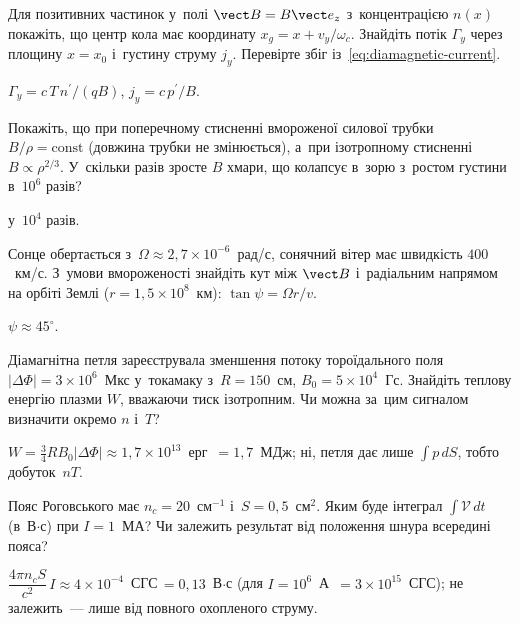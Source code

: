 \begin{problem}\label{prb:DiamagneticFlux}
	Для позитивних частинок у~полі $\vect B=B\vect e_z$ з~концентрацією $n(x)$ покажіть,
	що центр кола має координату $x_g=x+v_y/\omega_c$. Знайдіть потік $\Gamma_y$ через
	площину $x=x_0$ і~густину струму $j_y$. Перевірте збіг
	із~\eqref{eq:diamagnetic-current}.
	\begin{solution}
		$\Gamma_y=c\,T\,n^\prime/(qB)$, $j_y=c\,p^\prime/B$.
	\end{solution}
\end{problem}

\begin{problem}\label{prb:FluxTube}
	Покажіть, що при поперечному стисненні вмороженої силової трубки $B/\rho=\text{const}$
	(довжина трубки не змінюється), а~при ізотропному стисненні $B\propto\rho^{2/3}$.
	У~скільки разів зросте $B$ хмари, що колапсує в~зорю з~ростом густини в~$10^{6}$ разів?
	\begin{solution}
		у~$10^4$ разів.
	\end{solution}
\end{problem}

\begin{problem}\label{prb:ParkerSpiral}
	Сонце обертається з~$\Omega\approx2{,}7\times10^{-6}$~рад/с, сонячний вітер має швидкість
	$400$~км/с. З~умови вмороженості знайдіть кут між $\vect B$ і~радіальним напрямом на орбіті Землі
	($r=1{,}5\times10^{8}$~км): $\tan\psi=\Omega r/v$.
	\begin{solution}
		$\psi\approx45^\circ$.
	\end{solution}
\end{problem}

\begin{problem}\label{prb:DiamagneticLoop}
Діамагнітна петля зареєструвала зменшення потоку тороїдального поля $|\Delta\Phi|=3\times10^{6}$~Мкс у~токамаку з~$R=150$~см,
$B_0=5\times10^4$~Гс. Знайдіть теплову енергію плазми $W$, вважаючи тиск ізотропним. Чи можна за~цим сигналом визначити
окремо $n$ і~$T$?
	\begin{solution}
		$W=\tfrac34RB_0|\Delta\Phi|\approx1{,}7\times10^{13}$~ерг~$=1{,}7$~МДж; ні, петля дає лише $\int p\,dS$, тобто добуток~$nT$.
	\end{solution}
\end{problem}

\begin{problem}\label{prb:Rogowski}
Пояс Роговського має $n_c=20$~см$^{-1}$ і~$S=0{,}5$~см$^2$. Яким буде інтеграл $\int\mathcal{V}\,dt$ (в~В$\cdot$с) при $I=1$~МА? Чи залежить
результат від положення шнура всередині пояса?
	\begin{solution}
		$\dfrac{4\pi n_cS}{c^2}\,I\approx4\times10^{-4}$~СГС$\,=0{,}13$~В$\cdot$с (для $I=10^6$~А~$=3\times10^{15}$~СГС);
не залежить~--- лише від повного охопленого струму.
	\end{solution}
\end{problem}

